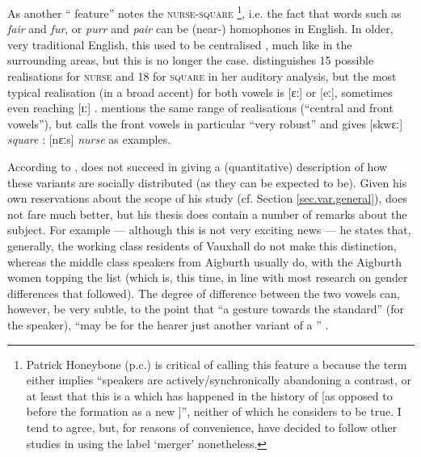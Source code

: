 As another `` feature'' \citet[72]{trudgill1999} notes the \textsc{nurse}-\textsc{square} \footnote{Patrick Honeybone (p.c.) is critical of calling this feature a  because the term either implies \enquote{speakers are actively/synchronically abandoning a contrast, or at least that this is a  which has happened in the history of  [as opposed to before the formation as a new ]}, neither of which he considers to be true. I tend to agree, but, for reasons of convenience, have decided to follow other studies \parencite{trudgill1999,watsonclark2013} in using the label \enquote*{merger} nonetheless.}, i.e. the fact that words such as \emph{fair} and \emph{fur}, or \emph{purr} and \emph{pair} can be (near-) homophones in  English.
In older, very traditional  English, this  used to be centralised \parencite[cf.][323]{west2015}, much like in the surrounding areas, but this is no longer the case.
\citet[cf.][68 and 71]{delyon1981} distinguishes 15 possible realisations for \textsc{nurse} and 18 for \textsc{square} in her auditory analysis, but the most typical realisation (in a broad  accent) for both vowels is [ɛː] or [eː], sometimes even reaching [ɪː] \citep[cf.][358]{watson2007}.
\citet[127]{honeybone2007} mentions the same range of realisations (``central and front vowels''), but calls the front vowels in particular ``very robust'' and gives [skwɛː] \emph{square} : [nɛːs] \emph{nurse} as examples.

According to \citet[358]{watson2007}, \textcite{delyon1981} does not succeed in giving a (quantitative) description of how these variants are socially distributed (as they can be expected to be).
Given his own reservations about the scope of his study (cf. Section \ref{sec.var.general}), \citet{knowles1973} does not fare much better, but his thesis does contain a number of remarks about the subject.
For example --- although this is not very exciting news --- he states that, generally, the working class residents of Vauxhall do not make this distinction, whereas the middle class speakers from Aigburth usually do, with the Aigburth women topping the list (which is, this time, in line with most research on gender differences that followed).
The degree of difference between the two vowels can, however, be very subtle, to the point that ``a gesture towards the  standard'' (for the speaker), ``may be for the hearer just another variant of a  '' \citep[cf.][295--297]{knowles1973}.

